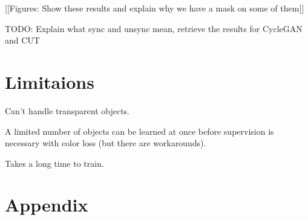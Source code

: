\documentclass{article}
\begin{document}
[[Figures: Show these results and explain why we have a mask on some of them]]

TODO: Explain what sync and unsync mean, retrieve the results for CycleGAN and CUT


\section{Limitaions}
\label{sec:Limitations} 

Can't handle transparent objects. 

A limited number of objects can be learned at once before supervision is necessary with color loss (but there are workarounds).

Takes a long time to train.






\clearpage
\acknowledgments{}








\clearpage

\section{Appendix} 
\label{sec:appendix}
\end{document}
